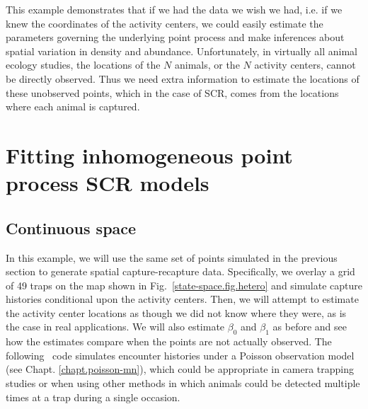 This example demonstrates
that if we had the data we wish we had, i.e. if we knew the
coordinates of the activity centers, we could easily estimate the
parameters governing the underlying point process and make inferences
about spatial variation in density and abundance. Unfortunately, in
virtually all animal ecology studies,
the locations of the $N$ animals, or the $N$ activity centers,
cannot be directly observed. Thus we need
extra information to estimate the locations of these unobserved
points, which in the case of SCR, comes from the locations where each
animal is captured.

\section{Fitting inhomogeneous point process SCR models}

\subsection{Continuous space}



In this example, we will use the same set of points simulated in the
previous section to generate spatial capture-recapture
data. Specifically, we overlay a grid of 49
traps on the map shown in Fig.~\ref{state-space.fig.hetero} and
simulate capture histories conditional upon the activity
centers. Then, we will attempt to estimate the activity center
locations as though we did not know where they were, as is the case in
real applications. We will also estimate $\beta_0$ and $\beta_1$ as
before and see how the estimates compare when the points are not
actually observed. The following \R~code simulates encounter histories under a
Poisson observation model (see Chapt. \ref{chapt.poisson-mn}), which could be appropriate in camera
trapping studies or when using other methods in which animals could
be detected multiple times at a trap during a single occasion.

